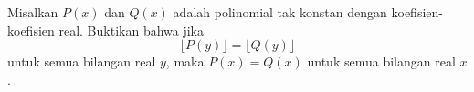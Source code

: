 Misalkan $P(x)$ dan $Q(x)$ adalah polinomial tak konstan dengan koefisien-koefisien real. Buktikan bahwa jika
\[ \lfloor P(y) \rfloor = \lfloor Q(y) \rfloor \]
untuk semua bilangan real $y$, maka $P(x) = Q(x)$ untuk semua bilangan real $x$.